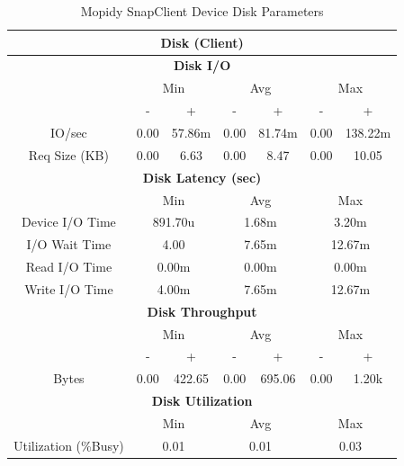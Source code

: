 \documentclass[11pt,a4paper]{scrreprt}
\begin{document}
\begin{table}[H]
\centering
    \begin{tabular}{||c|c|c|c|c|c|c||}
    \hline
    \multicolumn{7}{|c|}{\textbf{Disk (Client)}} \\
    \hline
    \multicolumn{7}{|c|}{\textbf{Disk I/O}} \\
    \hline\hline
      & \multicolumn{2}{|c|}{Min} & \multicolumn{2}{|c|}{Avg} & \multicolumn{2}{|c|}{Max} \\
    \hline
      & - & + & - & + & - & + \\
    \hline
    IO/sec & 0.00 & 57.86m & 0.00 & 81.74m & 0.00 & 138.22m \\
    \hline
    Req Size (KB) & 0.00 & 6.63 & 0.00 & 8.47 & 0.00 & 10.05 \\
    \hline\hline
    \multicolumn{7}{|c|}{\textbf{Disk Latency (sec)}} \\
    \hline\hline
      & \multicolumn{2}{|c|}{Min} & \multicolumn{2}{|c|}{Avg} & \multicolumn{2}{|c|}{Max} \\
    \hline
    Device I/O Time  & \multicolumn{2}{|c|}{891.70u} & \multicolumn{2}{|c|}{1.68m} & \multicolumn{2}{|c|}{3.20m} \\
    \hline
    I/O Wait Time  & \multicolumn{2}{|c|}{4.00} & \multicolumn{2}{|c|}{7.65m} & \multicolumn{2}{|c|}{12.67m} \\
    \hline
    Read I/O Time  & \multicolumn{2}{|c|}{0.00m} & \multicolumn{2}{|c|}{0.00m} & \multicolumn{2}{|c|}{0.00m} \\
    \hline
    Write I/O Time  & \multicolumn{2}{|c|}{4.00m} & \multicolumn{2}{|c|}{7.65m} & \multicolumn{2}{|c|}{12.67m} \\
    \hline\hline
    \multicolumn{7}{|c|}{\textbf{Disk Throughput}} \\
    \hline\hline
      & \multicolumn{2}{|c|}{Min} & \multicolumn{2}{|c|}{Avg} & \multicolumn{2}{|c|}{Max} \\
    \hline
      & - & + & - & + & - & + \\
    \hline
    Bytes & 0.00 & 422.65 & 0.00 & 695.06 & 0.00 & 1.20k \\
    \hline\hline
    \multicolumn{7}{|c|}{\textbf{Disk Utilization}} \\
    \hline\hline
      & \multicolumn{2}{|c|}{Min} & \multicolumn{2}{|c|}{Avg} & \multicolumn{2}{|c|}{Max} \\
    \hline
    Utilization (\%Busy)  & \multicolumn{2}{|c|}{0.01} & \multicolumn{2}{|c|}{0.01} & \multicolumn{2}{|c|}{0.03} \\
    \hline\hline
    \end{tabular}
    \caption{Mopidy SnapClient Device Disk Parameters}
    \label{MopidyclientDiskTab}
\end{table}
\end{document}
